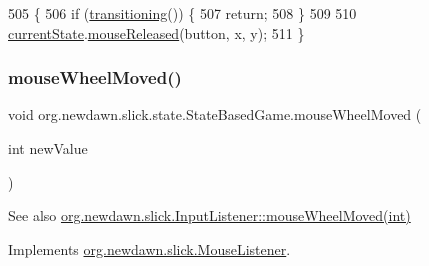\begin{DoxyCode}
505                                                         \{
506         \textcolor{keywordflow}{if} (\mbox{\hyperlink{classorg_1_1newdawn_1_1slick_1_1state_1_1_state_based_game_ae869c08778875776081935a090d4c92f}{transitioning}}()) \{
507             \textcolor{keywordflow}{return};
508         \}
509         
510         \mbox{\hyperlink{classorg_1_1newdawn_1_1slick_1_1state_1_1_state_based_game_a6a45e68094bb9b7ec30b8a8b7d415766}{currentState}}.\mbox{\hyperlink{interfaceorg_1_1newdawn_1_1slick_1_1_mouse_listener_a8d1606869f610664f9299565067d5571}{mouseReleased}}(button, x, y);
511     \}
\end{DoxyCode}
\mbox{\label{classorg_1_1newdawn_1_1slick_1_1state_1_1_state_based_game_a58843de40efec58100335c27499d1bd2}} 
\subsubsection{\texorpdfstring{mouse\+Wheel\+Moved()}{mouseWheelMoved()}}
{\footnotesize\ttfamily void org.\+newdawn.\+slick.\+state.\+State\+Based\+Game.\+mouse\+Wheel\+Moved (\begin{DoxyParamCaption}\item[{int}]{new\+Value }\end{DoxyParamCaption})\hspace{0.3cm}{\ttfamily [inline]}}

\begin{DoxySeeAlso}{See also}
\mbox{\hyperlink{interfaceorg_1_1newdawn_1_1slick_1_1_mouse_listener_ad7e49c969e1f0315ecdf238f715953d1}{org.\+newdawn.\+slick.\+Input\+Listener\+::mouse\+Wheel\+Moved(int)}} 
\end{DoxySeeAlso}


Implements \mbox{\hyperlink{interfaceorg_1_1newdawn_1_1slick_1_1_mouse_listener_ad7e49c969e1f0315ecdf238f715953d1}{org.\+newdawn.\+slick.\+Mouse\+Listener}}.


